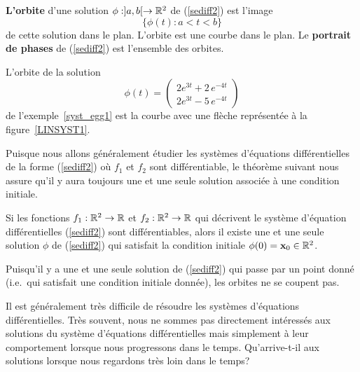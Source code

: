 {\begin{defn} 
{\bfseries L'orbite} d'une solution $\phi:]a,b[\rightarrow \mathbb{R}^2$ de
(\ref{sediff2}) est l'image
\[
\{ \phi(t) :  a < t < b \}
\]
de cette solution dans le plan.  L'orbite est une courbe dans le plan.
Le {\bfseries portrait de phases} de (\ref{sediff2}) est l'ensemble
des orbites.
\end{defn}

\begin{egg}
L'orbite de la solution 
\[
\phi(t) =
\begin{pmatrix}
2 e^{3t}+ 2\,e^{-4t} \\ 2 e^{3t} - 5\,e^{-4t}
\end{pmatrix}
\]
de l'exemple~\ref{syst_egg1} est la courbe avec une flèche représentée
à la figure~\ref{LINSYST1}.
\end{egg}


Puisque nous allons généralement étudier les systèmes d'équations
différentielles de la forme (\ref{sediff2}) où $f_1$ et $f_2$ sont
différentiable, le théorème suivant nous assure qu'il y aura toujours
une et une seule solution associée à une condition initiale.

\begin{theorem}
Si les fonctions $f_1:\mathbb{R}^2 \rightarrow \mathbb{R}$ et $f_2:\mathbb{R}^2\rightarrow \mathbb{R}$
qui décrivent le système d'équation différentielles
(\ref{sediff2}) sont différentiables, alors il existe une et une seule 
solution $\phi$ de (\ref{sediff2}) qui satisfait la condition initiale
$\phi(0) = \mathbf{x}_0 \in \mathbb{R}^2$.
\end{theorem}

\begin{rmk}
Puisqu'il y a une et une seule solution de (\ref{sediff2}) qui passe par un
point donné (i.e.\ qui satisfait une condition initiale donnée), les orbites
ne se coupent pas.
\end{rmk}

Il est généralement très difficile de résoudre les systèmes d'équations
différentielles.  Très souvent, nous ne sommes pas directement intéressés aux
solutions du système d'équations différentielles mais simplement à leur
comportement lorsque nous progressons dans le temps. Qu'arrive-t-il aux
solutions lorsque nous regardons très loin dans le temps?

}
